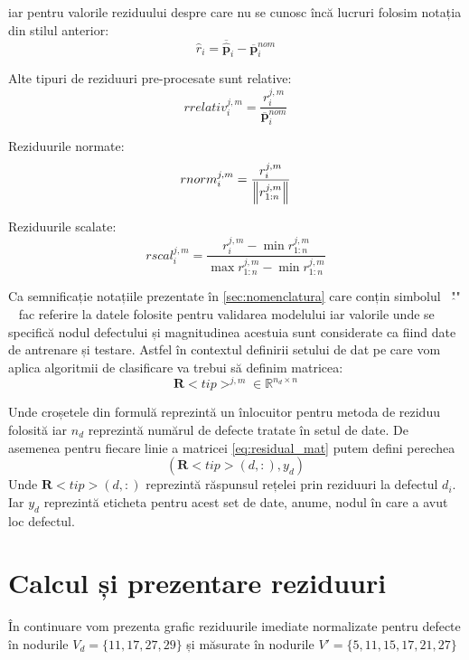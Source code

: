 iar pentru valorile reziduului despre care nu se cunosc încă lucruri folosim notația din stilul anterior:
\begin{equation}
\widehat{r}_i = \overline{\widehat{\mathbf{p}}}_i - \overline{\mathbf{p}}_i^{nom}
\label{eq:measured_residual}
\end{equation}

Alte tipuri de reziduuri pre-procesate sunt relative:
\begin{equation}
rrelativ_i^{j,m} = \frac{r_i^{j,m}}{\overline{\mathbf{p}}_i^{nom}} 
\label{eq:relative_residual}
\end{equation}

Reziduurile normate:
\begin{equation}
rnorm_{i}^{j,m} =  \frac{r_i^{j,m}}{ \left\lVert r_{1:n}^{j,m}\right\rVert} 
\label{eq:norm_residual}
\end{equation}

Reziduurile scalate:
\begin{equation}
rscal_{i}^{j,m} = \frac{r_i^{j,m} - \min r_{1:n}^{j,m}}{ \max r_{1:n}^{j,m} -  \min r_{1:n}^{j,m}}
\label{eq:scaled_residual}
\end{equation}


Ca semnificație notațiile prezentate în \ref{sec:nomenclatura} care conțin simbolul~ "$\widehat{}$" ~ fac referire la datele folosite pentru validarea modelului iar valorile unde se specifică nodul defectului și magnitudinea acestuia sunt considerate ca fiind date de antrenare și testare. Astfel în contextul definirii setului de dat pe care vom aplica algoritmii de clasificare va trebui să definim matricea:
\begin{equation}
\mathbf{R}<tip>^{j, m} \in \mathbb{R}^{n_{d} \times n}
\label{eq:residual_mat}
\end{equation}

Unde croșetele din formulă reprezintă un înlocuitor pentru metoda de reziduu folosită iar $n_{d}$ reprezintă numărul de defecte tratate în setul de date. De asemenea pentru fiecare linie a matricei \eqref{eq:residual_mat} putem defini perechea
\begin{equation}
\left( \mathbf{R}<tip>(d,:), y_{d} \right)
\label{eq:residual_mat_label}
\end{equation} 
Unde $ \mathbf{R}<tip>(d,:)$ reprezintă răspunsul rețelei prin reziduuri la defectul $d_i$. Iar $y_{d}$ reprezintă eticheta pentru acest set de date, anume, nodul în care a avut loc defectul.

\section{Calcul și prezentare reziduuri}
În continuare vom prezenta grafic reziduurile imediate normalizate pentru defecte în nodurile $V_d =\{11,17,27,29\}$ și măsurate în nodurile $V' = \{5,11,15,17,21,27 \}$


